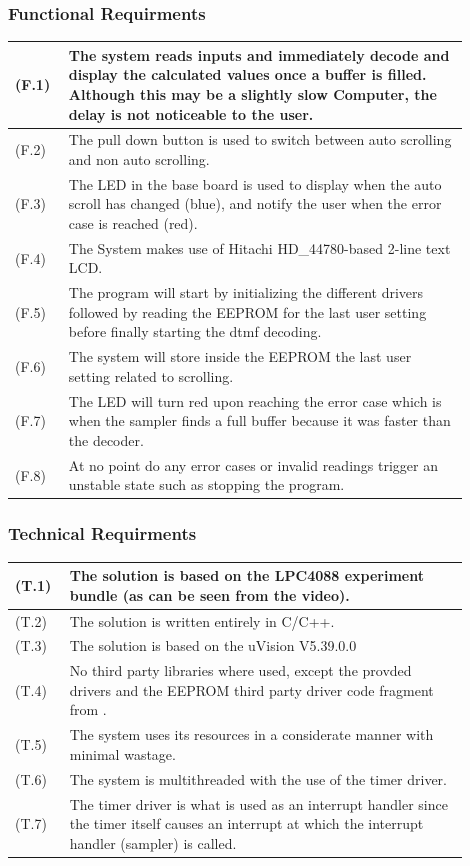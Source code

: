 \documentclass{cce2014-design}
\begin{document}
\subsubsection{Functional Requirments}
\begin{tabular}{|p{0.1\linewidth} | p{0.8\linewidth}|}\hline
	(F.1) & The system reads inputs and immediately decode and display the
	calculated values once a buffer is filled. Although this may be a slightly
    slow Computer, the delay is not noticeable to the user.
    \\ \hline
	(F.2) & The pull down button is used to switch between auto scrolling and non
    auto scrolling.
    \\ \hline
	(F.3) & The LED in the base board is used to display when the auto scroll has
    changed (blue), and notify the user when the error case is reached (red).
    \\ \hline
	(F.4) & The System makes use of Hitachi HD\_{44780}-based 2-line text
    LCD. 
    \\	\hline
	(F.5) & The program will start by initializing the different drivers followed by
    reading the EEPROM for the last user setting before finally starting the dtmf
    decoding.
    \\ \hline
	(F.6) & The system will store inside the EEPROM the last user setting related
    to scrolling.
    \\ \hline
	(F.7) & The LED will turn red upon reaching the error case which is when the sampler
    finds a full buffer because it was faster than the decoder.
    \\ \hline
	(F.8) & At no point do any error cases or invalid readings trigger an unstable state
    such as stopping the program.
    \\ \hline
\end{tabular}

\subsubsection{Technical Requirments}
\begin{tabular}{|p{0.1\linewidth} | p{0.8\linewidth}|}\hline
	(T.1) & The solution is based on the LPC4088 experiment bundle (as can be seen
	from the video).
    \\ \hline
	(T.2) & The solution is written entirely in C/C++.
    \\ \hline
	(T.3) & The solution is based on the uVision V5.39.0.0
    \\ \hline
	(T.4) & No third party libraries where used, except the provded
	drivers and the EEPROM third party driver code fragment from \cite{nxp-cdl}.
    \\ \hline
	(T.5) & The system uses its resources in a considerate manner with minimal wastage.
    \\ \hline
	(T.6) & The system is multithreaded with the use of the timer driver.
    \\ \hline
	(T.7) & The timer driver is what is used as an interrupt handler since the timer 
	itself causes an interrupt at which the interrupt handler (sampler) is called.
    \\ \hline
\end{tabular}
\end{document}

